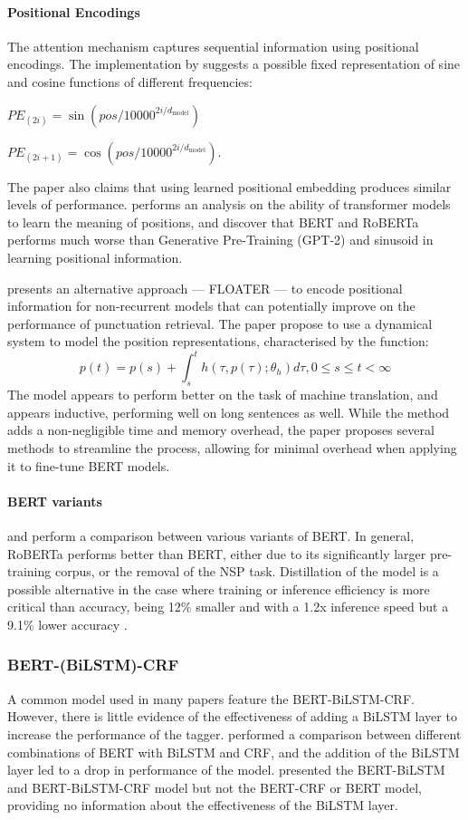 \documentclass[a4paper]{article}
\begin{document}
\paragraph{Positional Encodings}
The attention mechanism captures sequential information using positional encodings. The implementation by \cite{attentionisallyouneed} suggests a possible fixed representation of sine and cosine functions of different frequencies: 

$PE_{(2i)} = \sin{(pos/10000^{2i/d_{\text{model}}})}$

$PE_{(2i+1)} = \cos{(pos/10000^{2i/d_{\text{model}}})}$. 

The paper also claims that using learned positional embedding produces similar levels of performance. \cite{positionembedding} performs an analysis on the ability of transformer models to learn the meaning of positions, and discover that BERT and RoBERTa performs much worse than Generative Pre-Training (GPT-2) and sinusoid in learning positional information.

\cite{floater} presents an alternative approach --- FLOATER --- to encode positional information for non-recurrent models that can potentially improve on the performance of punctuation retrieval. The paper propose to use a dynamical system to model the position representations, characterised by the function: \[p(t)=p(s)+\int_s^t{ h(\tau,p(\tau);\theta_h)d\tau}, 0\leq s \leq t < \infty\]
The model appears to perform better on the task of machine translation, and appears inductive, performing well on long sentences as well. While the method adds a non-negligible time and memory overhead, the paper proposes several methods to streamline the process, allowing for minimal overhead when applying it to fine-tune BERT models.

\paragraph{BERT variants}
\cite{medicalasr} and \cite{efficientbertrobust} perform a comparison between various variants of BERT. In general, RoBERTa performs better than BERT, either due to its significantly larger pre-training corpus, or the removal of the NSP task. Distillation of the model is a possible alternative in the case where training or inference efficiency is more critical than accuracy, being 12\% smaller and with a 1.2x inference speed but a 9.1\% lower accuracy \citep{efficientbertrobust}.

\subsubsection{BERT-(BiLSTM)-CRF}
A common model used in many papers feature the BERT-BiLSTM-CRF. However, there is little evidence of the effectiveness of adding a BiLSTM layer to increase the performance of the tagger. \cite{bertcrf} performed a comparison between different combinations of BERT with BiLSTM and CRF, and the addition of the BiLSTM layer led to a drop in performance of the model. \cite{chinesebertbilstm} presented the BERT-BiLSTM and BERT-BiLSTM-CRF model but not the BERT-CRF or BERT model, providing no information about the effectiveness of the BiLSTM layer.
\end{document}
